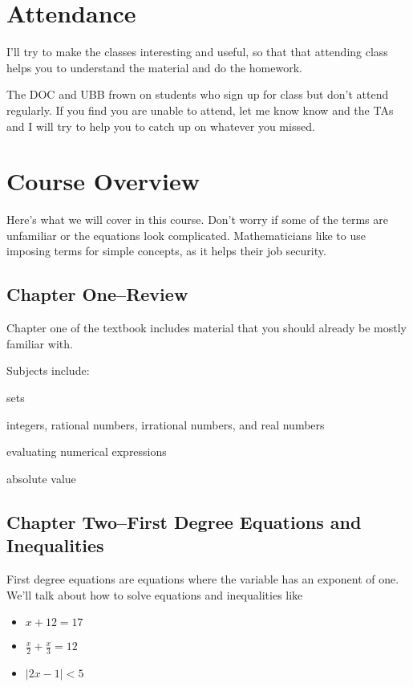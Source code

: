 \documentclass{article}
\begin{document}
\section{Attendance}

I'll try to make the classes interesting and useful, so that that attending class helps you to understand the
material and do the homework.

The DOC and UBB frown on students who sign up for class but don't attend regularly.  If you find you are unable to
attend, let me know know and the TAs and I will try to help you to catch up on whatever you missed.

\section{Course Overview}

Here's what we will cover in this course.  Don't worry if some of the terms are unfamiliar or the equations look
complicated.  Mathematicians like to use imposing terms for simple concepts, as it helps their job security.  

\subsection{Chapter One--Review}
Chapter one of the textbook includes material that you should already be mostly familiar with.  

Subjects include:
\begin{itemize*}
\item{sets}
\item{integers, rational numbers, irrational numbers, and real numbers}
\item{evaluating numerical expressions}
\item{absolute value}
\end{itemize*}

\subsection{Chapter Two--First Degree Equations and Inequalities}

First degree equations are equations where the variable has an exponent of one.  We'll talk about how to solve equations
and inequalities like

\begin{itemize}
  \item \(x + 12 = 17 \)
  \item \( \frac{x}{2} + \frac{x}{3} = 12 \)
  \item \(|2x - 1| < 5\)
\end{itemize}
\end{document}
